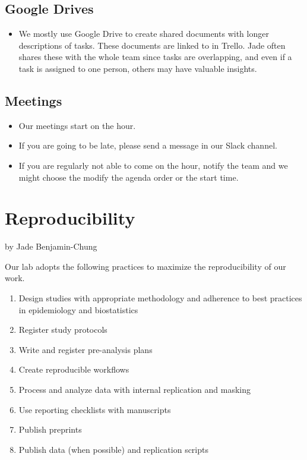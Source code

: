 \documentclass[
]{book}
\providecommand{\tightlist}{%
  \setlength{\itemsep}{0pt}\setlength{\parskip}{0pt}}
\begin{document}
\section{Google Drives}\label{google-drives}

\begin{itemize}
\tightlist
\item
  We mostly use Google Drive to create shared documents with longer descriptions of tasks. These documents are linked to in Trello. Jade often shares these with the whole team since tasks are overlapping, and even if a task is assigned to one person, others may have valuable insights.
\end{itemize}

\section{Meetings}\label{meetings}

\begin{itemize}
\tightlist
\item
  Our meetings start on the hour.
\item
  If you are going to be late, please send a message in our Slack channel.
\item
  If you are regularly not able to come on the hour, notify the team and we might choose the modify the agenda order or the start time.
\end{itemize}

\chapter{Reproducibility}\label{reproducibility}

by Jade Benjamin-Chung

Our lab adopts the following practices to maximize the reproducibility of our work.

\begin{enumerate}
\def\labelenumi{\arabic{enumi}.}
\tightlist
\item
  Design studies with appropriate methodology and adherence to best practices in epidemiology and biostatistics
\item
  Register study protocols
\item
  Write and register pre-analysis plans
\item
  Create reproducible workflows
\item
  Process and analyze data with internal replication and masking
\item
  Use reporting checklists with manuscripts
\item
  Publish preprints
\item
  Publish data (when possible) and replication scripts
\end{enumerate}
\end{document}
